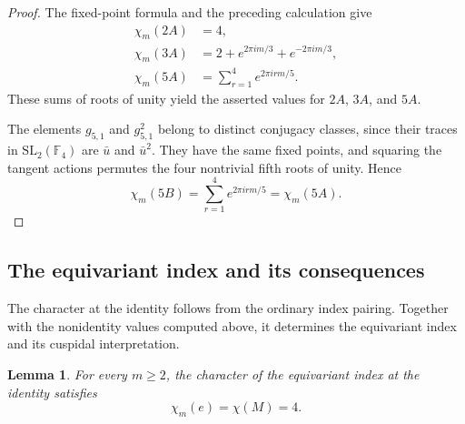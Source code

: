 \documentclass[11pt]{article}
\theoremstyle{definition}
\theoremstyle{plain}
\numberwithin{equation}{section}
\newtheorem{lemma}[theorem]{Lemma}
\begin{document}
\begin{proof}
The fixed-point formula and the
preceding calculation give
\[
\begin{aligned}
\chi_m(2A)&=4,\\
\chi_m(3A)&=2+e^{2\pi im/3}
                  +e^{-2\pi im/3},\\
\chi_m(5A)&=\sum_{r=1}^4 e^{2\pi irm/5}.
\end{aligned}
\]
These sums of roots of unity yield
the asserted values for $2A$, $3A$,
and $5A$.

The elements $g_{5,1}$ and $g_{5,1}^2$
belong to distinct conjugacy classes,
since their traces in
$\mathrm{SL}_2(\mathbb F_4)$
are $\bar u$ and $\bar u^2$.
They have the same fixed points,
and squaring the tangent actions
permutes the four nontrivial fifth
roots of unity. Hence
\[
\chi_m(5B)
=\sum_{r=1}^4e^{2\pi irm/5}
=\chi_m(5A).
\]
\end{proof}
\subsection{The equivariant index and its consequences}
\label{subsec:a5-results}

The character at the identity follows from the ordinary index
pairing. Together with the nonidentity values computed above,
it determines the equivariant index and its cuspidal interpretation.


\begin{lemma}\label{lem:a5-identity}
For every $m\geq 2$, the character of the equivariant
index at the identity satisfies
\begin{equation}\label{eq:a5-identity}
  \chi_m(e)=\chi(M)=4.
\end{equation}
\end{lemma}
\end{document}
